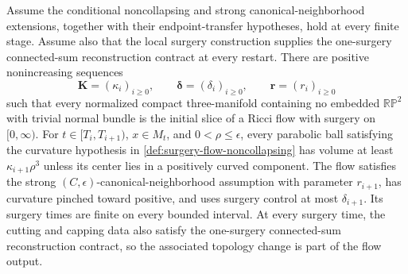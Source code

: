 \begin{theorem}
\label{thm:all-time-controlled-surgery-flow}
\notready
Assume the conditional noncollapsing and strong canonical-neighborhood
extensions, together with their endpoint-transfer hypotheses, hold at every
finite stage.  Assume also that the local surgery construction supplies the
one-surgery connected-sum reconstruction contract at every restart.  There
are positive nonincreasing sequences
\[
 \mathbf K=(\kappa_i)_{i\ge0},\qquad
 \boldsymbol\delta=(\delta_i)_{i\ge0},\qquad
 \mathbf r=(r_i)_{i\ge0}
\]
such that every normalized compact three-manifold containing no embedded
$\mathbb{RP}^2$ with trivial normal bundle is the initial slice of a Ricci
flow with surgery on $[0,\infty)$.  For $t\in[T_i,T_{i+1})$, $x\in M_t$, and
$0<\rho\le\epsilon$, every parabolic ball satisfying the curvature hypothesis in
\ref{def:surgery-flow-noncollapsing} has volume at least
$\kappa_{i+1}\rho^3$ unless its center lies in a positively curved component.
The flow satisfies the strong $(C,\epsilon)$-canonical-neighborhood assumption
with parameter $r_{i+1}$, has curvature pinched toward positive, and uses
surgery control at most $\delta_{i+1}$.  Its surgery times are finite on every
bounded interval.
At every surgery time, the cutting and capping data also satisfy the
one-surgery connected-sum reconstruction contract, so the associated topology
change is part of the flow output.
\end{theorem}

